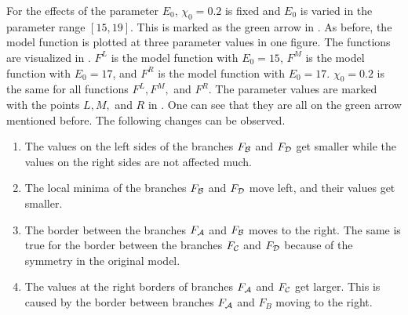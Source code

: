 For the effects of the parameter $E_0$, $\chi_0 = 0.2$ is fixed and $E_0$ is varied in the parameter range $[15, 19]$.
This is marked as the green arrow in .
As before, the model function is plotted at three parameter values in one figure.
The functions are visualized in .
$F^L$ is the model function with $E_0 = 15$, $F^M$ is the model function with $E_0 = 17$, and $F^R$ is the model function with $E_0 = 17$.
$\chi_0 = 0.2$ is the same for all functions $F^L, F^M,$ and $F^R$.
The parameter values are marked with the points $L, M,$ and $R$ in .
One can see that they are all on the green arrow mentioned before.
The following changes can be observed.
\begin{enumerate}
	\item The values on the left sides of the branches $F_{\mathcal{B}}$ and $F_{\mathcal{D}}$ get smaller while the values on the right sides are not affected much.	\item The local minima of the branches $F_{\mathcal{B}}$ and $F_{\mathcal{D}}$ move left, and their values get smaller.
	\item The border between the branches $F_{\mathcal{A}}$ and $F_{\mathcal{B}}$ moves to the right.
	      The same is true for the border between the branches $F_{\mathcal{C}}$ and $F_{\mathcal{D}}$ because of the symmetry in the original model.
	\item The values at the right borders of branches $F_{\mathcal{A}}$ and $F_{\mathcal{C}}$ get larger. This is caused by the border between branches $F_{\mathcal{A}}$ and $F_B$ moving to the right.
\end{enumerate}

